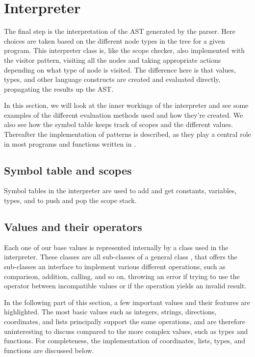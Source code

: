 \section{Interpreter}
The final step is the interpretation of the AST generated by the parser.
Here choices are taken based on the different node types in the tree
for a given program. This interpreter class is, like the scope checker,
also implemented with the visitor pattern, visiting all the nodes and
taking appropriate actions depending on what type of node is visited.
The difference here is that values, types, and other language constructs
are created and evaluated directly, propagating the results up the AST.

In this section, we will look at the inner workings of the interpreter
and see some examples of the different evaluation methods used and how
they're created. We also see how the symbol table keeps track of scopes
and the different values. Thereafter the implementation of patterns is
described, as they play a central role in most programs and functions
written in \productname{}.

\subsection{Symbol table and scopes}
Symbol tables in the interpreter are used to add and get constants,
variables, types, and to push and pop the scope stack.

\subsection{Values and their operators}
Each one of our base values is represented internally by a class used in
the interpreter. These classes are all sub-classes of a general class
, that offers the sub-classes an interface to implement
various different operations, such as comparison, addition, calling,
and so on, throwing an error if trying to use the operator between
incompatible values or if the operation yields an invalid result.

In the following part of this section, a few important values and their
features are highlighted. The most basic values such as integers,
strings, directions, coordinates, and lists principally support the same
operations, and are therefore uninteresting to discuss compared to the
more complex values, such as types and functions. For completeness, the
implementation of coordinates, lists, types, and functions are discussed
below.

